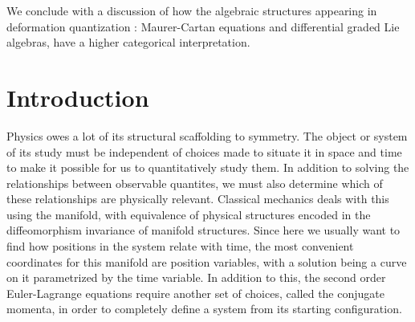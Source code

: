 \documentclass[
  12pt,
  a4paper, oneside
]{report}
\theoremstyle{bolddef}
\theoremstyle{remark}
\numberwithin{equation}{chapter}
\begin{document}
We conclude with a discussion of how the algebraic structures appearing in deformation quantization : Maurer-Cartan equations and differential graded Lie algebras, have a higher categorical interpretation.


\clearpage

\chapter{Introduction}
Physics owes a lot of its structural scaffolding to symmetry. The object or system of its study must be independent of choices
made to situate it in space and time to make it possible for us to quantitatively study them. In addition to solving the 
relationships between observable quantites, we must also determine which of these relationships are physically relevant. Classical 
mechanics deals with this using the manifold, with equivalence of physical structures encoded in the 
diffeomorphism invariance of manifold structures. Since here we usually want to find how positions in the system relate with time, 
the most convenient coordinates for this manifold are position variables, with a solution being a curve on it parametrized by the 
time variable. In addition to this, the second order Euler-Lagrange equations require another set of choices, called 
the conjugate momenta, in order to completely define a system from its starting configuration.
\end{document}
